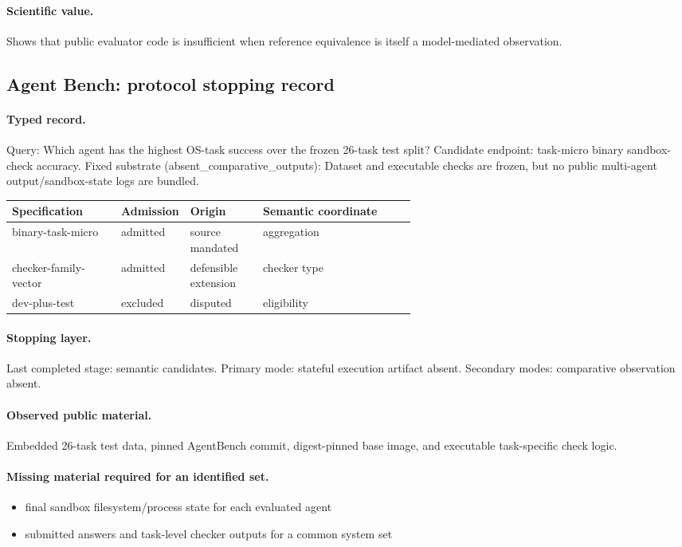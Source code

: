 \paragraph{Scientific value.} Shows that public evaluator code is insufficient when reference equivalence is itself a model-mediated observation.

\subsection{Agent Bench: protocol stopping record}\label{app:r8-agent-bench}

\paragraph{Typed record.} Query: Which agent has the highest OS-task success over the frozen 26-task test split? Candidate endpoint: task-micro binary sandbox-check accuracy. Fixed substrate (absent\_comparative\_outputs): Dataset and executable checks are frozen, but no public multi-agent output/sandbox-state logs are bundled.

\begingroup
\scriptsize
\begin{tabularx}{\linewidth}{@{}p{0.27\linewidth}p{0.14\linewidth}p{0.18\linewidth}X@{}}
\toprule
Specification & Admission & Origin & Semantic coordinate \\
\midrule
binary-task-micro & admitted & source mandated & aggregation \\
checker-family-vector & admitted & defensible extension & checker type \\
dev-plus-test & excluded & disputed & eligibility \\
\bottomrule
\end{tabularx}
\endgroup

\paragraph{Stopping layer.} Last completed stage: semantic candidates. Primary mode: stateful execution artifact absent. Secondary modes: comparative observation absent.

\paragraph{Observed public material.} Embedded 26-task test data, pinned AgentBench commit, digest-pinned base image, and executable task-specific check logic.

\paragraph{Missing material required for an identified set.}
\begin{itemize}
  \item final sandbox filesystem/process state for each evaluated agent
  \item submitted answers and task-level checker outputs for a common system set
\end{itemize}

